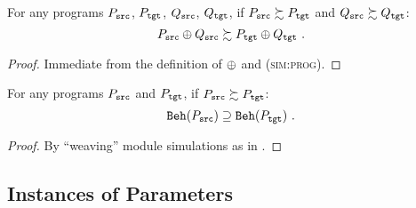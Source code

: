\begin{theorem}[HorComp]
  For any programs $P_{\texttt{src}}$, $P_{\texttt{tgt}}$, $Q_{\texttt{src}}$, $Q_{\texttt{tgt}}$, if $P_{\texttt{src}} \succsim P_{\texttt{tgt}}$ and
  $Q_{\texttt{src}} \succsim Q_{\texttt{tgt}}$:
  \[
  \vspace{-0.8mm}
  P_\src \llink Q_\src \succsim P_\tgt \llink Q_\tgt~.
  \vspace{-0.8mm}
  \]
\end{theorem}
\begin{proof} Immediate from the definition of $\oplus$ and \textsc{(sim:prog)}.
\end{proof}
\begin{theorem}[Adequacy]
  For any programs $P_{\texttt{src}}$ and $P_{\texttt{tgt}}$, if $P_{\texttt{src}} \succsim P_{\texttt{tgt}}$:
  \[
  \vspace{-0.8mm}
  \beh{P_\src} \supseteq \beh{P_\tgt}~.
  \vspace{-0.8mm}
  \]
\end{theorem}
\begin{proof} By ``weaving'' module simulations as in \cite{pb}.
\end{proof}



\subsection{Instances of Parameters}

